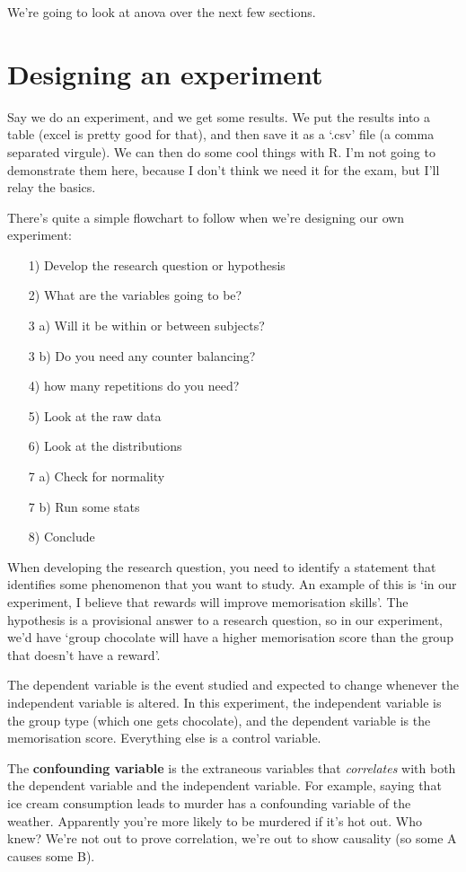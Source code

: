 \documentclass[11pt,a4paper,titlepage]{scrartcl}
\begin{document}
We're going to look at anova over the next few sections.

\section{Designing an experiment}%
\label{sec:designing}
Say we do an experiment, and we get some results. We put the results into
a table (excel is pretty good for that), and then save it as a `.csv'
file (a comma separated virgule). We can then do some cool things with R.
I'm not going to demonstrate them here, because I don't think we need it
for the exam, but I'll relay the basics.

There's quite a simple flowchart to follow when we're designing our own
experiment:
\begin{enumerate}
    \item[1)] Develop the research question or hypothesis
    \item[2)] What are the variables going to be?
    \item[3 a)] Will it be within or between subjects?
    \item[3 b)] Do you need any counter balancing?
    \item[4)] how many repetitions do you need?
    \item[5)] Look at the raw data
    \item[6)] Look at the distributions
    \item[7 a)] Check for normality
    \item[7 b)] Run some stats
    \item[8)] Conclude
\end{enumerate}

When developing the research question, you need to identify a statement
that identifies some phenomenon that you want to study. An example of this
is `in our experiment, I believe that rewards will improve memorisation
skills'. The hypothesis is a provisional answer to a research question, so
in our experiment, we'd have `group chocolate will have a higher
memorisation score than the group that doesn't have a reward'.

The dependent variable is the event studied and expected to change
whenever the independent variable is altered. In this experiment, the
independent variable is the group type (which one gets chocolate), and the
dependent variable is the memorisation score. Everything else is a control
variable.

The \textbf{confounding variable} is the extraneous variables that
\textit{correlates} with both the dependent variable and the independent
variable. For example, saying that ice cream consumption leads to murder
has a confounding variable of the weather. Apparently you're more likely
to be murdered if it's hot out. Who knew? We're not out to prove
correlation, we're out to show causality (so some A causes some B).
\end{document}

